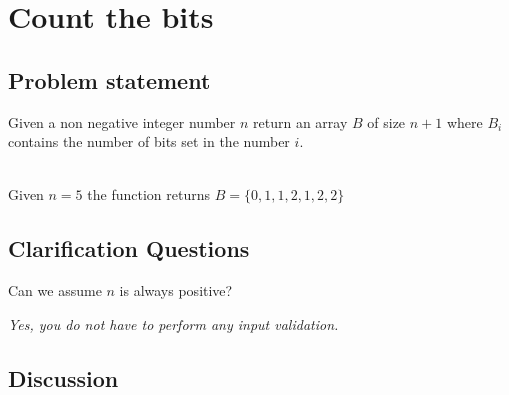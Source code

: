 %



\chapter{Count the bits}
\label{ch:count_bits}

\section{Problem statement}
\begin{exercise}
\label{example:count_bits:exercice1}
Given a non negative integer number $n$ return an array $B$ of size $n+1$ where $B_i$ contains the
number of bits set in the number $i$.
	\begin{example}
		\label{example:count_bits:example1}
		\hfill \\
		Given $n = 5$ the function returns $B = \{0,1,1,2,1,2,2\}$	
	\end{example}

\end{exercise}

\section{Clarification Questions}

\begin{QandA}
	\item Can we assume $n$ is always positive?
	\begin{answered}
		\textit{Yes, you do not have to perform any input validation.}
	\end{answered}
	
\end{QandA}

\section{Discussion}
\label{count_bits:sec:discussion}



